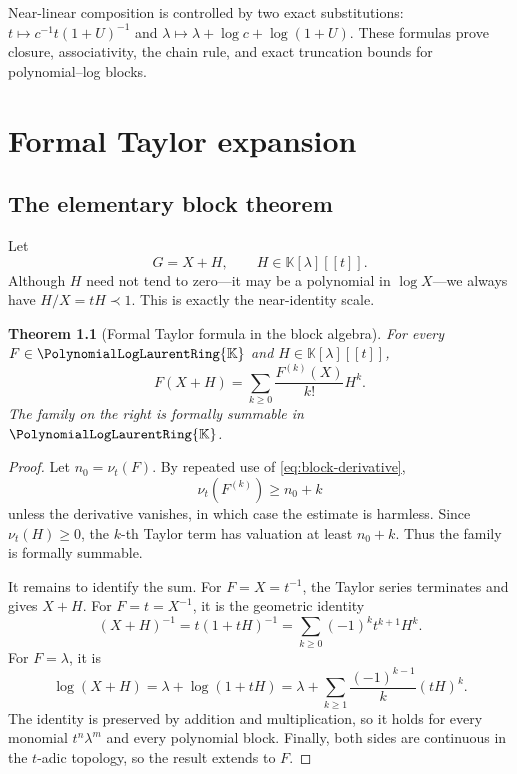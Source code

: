 \documentclass[11pt,openany]{book}
\theoremstyle{definition}
\theoremstyle{plain}
\newtheorem{theorem}{Theorem}[chapter]
\theoremstyle{remark}
\newcommand{\K}{\mathbb{K}}
\newcommand{\Plog}{\PolynomialLogLaurentRing{\K}}
\newcommand{\precdom}{\prec}
\newcommand{\val}{\nu}
\begin{document}
\begin{summarybox}
Near-linear composition is controlled by two exact substitutions: \(t\mapsto c^{-1}t(1+U)^{-1}\) and \(\lambda\mapsto\lambda+\log c+\log(1+U)\). These formulas prove closure, associativity, the chain rule, and exact truncation bounds for polynomial--log blocks.
\end{summarybox}

\chapter{Formal Taylor expansion}\label{ch:taylor}

\section{The elementary block theorem}
Let
\begin{equation}\label{eq:G-XH}
 G=X+H,
 \qquad H\in\K[\lambda][[t]].
\end{equation}
Although \(H\) need not tend to zero---it may be a polynomial in \(\log X\)---we always have \(H/X=tH\precdom1\). This is exactly the near-identity scale.

\begin{theorem}[Formal Taylor formula in the block algebra]\label{thm:block-taylor}
For every \(F\in\Plog\) and \(H\in\K[\lambda][[t]]\),
\begin{equation}\label{eq:block-taylor}
 F(X+H)=\sum_{k\ge0}\frac{F^{(k)}(X)}{k!}H^k.
\end{equation}
The family on the right is formally summable in \(\Plog\).
\end{theorem}

\begin{proof}
Let \(n_0=\val_t(F)\). By repeated use of \cref{eq:block-derivative},
\[
 \val_t(F^{(k)})\ge n_0+k
\]
unless the derivative vanishes, in which case the estimate is harmless. Since \(\val_t(H)\ge0\), the \(k\)-th Taylor term has valuation at least \(n_0+k\). Thus the family is formally summable.

It remains to identify the sum. For \(F=X=t^{-1}\), the Taylor series terminates and gives \(X+H\). For \(F=t=X^{-1}\), it is the geometric identity
\[
 (X+H)^{-1}=t(1+tH)^{-1}
 =\sum_{k\ge0}(-1)^kt^{k+1}H^k.
\]
For \(F=\lambda\), it is
\[
 \log(X+H)=\lambda+\log(1+tH)
 =\lambda+\sum_{k\ge1}\frac{(-1)^{k-1}}k(tH)^k.
\]
The identity is preserved by addition and multiplication, so it holds for every monomial \(t^n\lambda^m\) and every polynomial block. Finally, both sides are continuous in the \(t\)-adic topology, so the result extends to \(F\).
\end{proof}
\end{document}
